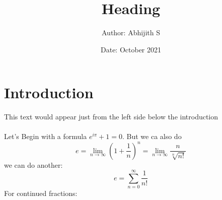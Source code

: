 \documentclass{article}
\title{Heading}
\author{Author: Abhijith S}
\date{Date: October 2021}
\begin{document}

\maketitle

\section{Introduction}

This text would appear just from the left side below the introduction\\\\
Let's Begin with a formula $e^{i\pi}+1 = 0$. 
\newline
But we ca also do 
$$e =  \lim_{n\to\infty}\left(1+ \frac{1}{n}\right)^n = \lim_{n\to\infty}\frac{n}{\sqrt[n]{n!}}$$
we can do another: $$e = \sum_{n=0}^{\infty}\frac{1}{n!}$$
For continued fractions:$$$$
\end{document}
